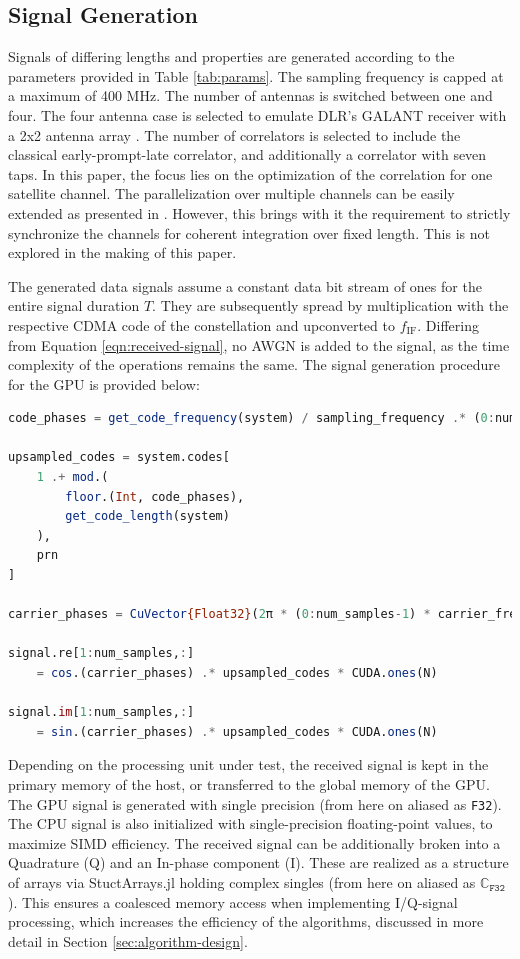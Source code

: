 \documentclass{juliacon}
\begin{document}
\subsection*{Signal Generation}

Signals of differing lengths and properties are generated according to the parameters provided in Table \ref{tab:params}. The sampling frequency is capped at a maximum of 400 MHz. The number of antennas is switched between one and four. The four antenna case is selected to emulate DLR's GALANT receiver with a 2x2 antenna array \cite{Cuntz2009}. The number of correlators is selected to include the classical early-prompt-late correlator, and additionally a correlator with seven taps. In this paper, the focus lies on the optimization of the correlation for one satellite channel. The parallelization over multiple channels can be easily extended as presented in \cite{Xu2017}. However, this brings with it the requirement to strictly synchronize the channels for coherent integration over fixed length. This is not explored in the making of this paper.

The generated data signals assume a constant data bit stream of ones for the entire signal duration $T$. They are subsequently spread by multiplication with the respective CDMA code of the constellation and upconverted to $f_{\mathrm{IF}}$. Differing from Equation \ref{eqn:received-signal}, no AWGN is added to the signal, as the time complexity of the operations remains the same. The signal generation procedure for the GPU is provided below: 
\begin{lstlisting}[language = Julia]
code_phases = get_code_frequency(system) / sampling_frequency .* (0:num_samples-1) .+ start_code_phase

upsampled_codes = system.codes[
    1 .+ mod.(
        floor.(Int, code_phases),
        get_code_length(system)
    ),
    prn
]

carrier_phases = CuVector{Float32}(2π * (0:num_samples-1) * carrier_frequency / sampling_frequency .+ start_carrier_phase)

signal.re[1:num_samples,:] 
    = cos.(carrier_phases) .* upsampled_codes * CUDA.ones(N)

signal.im[1:num_samples,:] 
    = sin.(carrier_phases) .* upsampled_codes * CUDA.ones(N)
\end{lstlisting}
Depending on the processing unit under test, the received signal is kept in the primary memory of the host, or transferred to the global memory of the GPU. The GPU signal is generated with single precision (from here on aliased as \texttt{F32}). The CPU signal is also initialized with single-precision floating-point values, to maximize SIMD efficiency. The received signal can be additionally broken into a Quadrature (Q) and an In-phase component (I). These are realized as a structure of arrays via StuctArrays.jl holding complex singles (from here on aliased as $\mathbb{C}_{\texttt{F32}}$). This ensures a coalesced memory access when implementing I/Q-signal processing, which increases the efficiency of the algorithms, discussed in more detail in Section \ref{sec:algorithm-design}.
\end{document}
